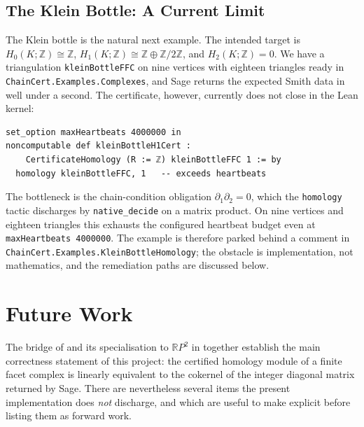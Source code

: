 \documentclass[11pt]{article}
\theoremstyle{plain}
\theoremstyle{definition}
\theoremstyle{remark}
\newcommand{\lean}[1]{\lstinline[language=lean]|#1|}
\begin{document}
\subsection{The Klein Bottle: A Current Limit}\label{sec:klein-attempt}

The Klein bottle is the natural next example. The intended target is
\(H_0(K;\mathbb{Z}) \cong \mathbb{Z}\),
\(H_1(K;\mathbb{Z}) \cong \mathbb{Z} \oplus \mathbb{Z}/2\mathbb{Z}\), and
\(H_2(K;\mathbb{Z}) = 0\). We have a triangulation
\lean{kleinBottleFFC} on nine vertices with eighteen triangles ready in
\texttt{ChainCert.Examples.Complexes}, and Sage returns the expected
Smith data in well under a second. The certificate, however, currently
does not close in the Lean kernel:
\begin{lstlisting}[caption={Klein bottle: cert still has a heartbeat-bound \texttt{sorry}.},label={lst:klein-attempt}]
set_option maxHeartbeats 4000000 in
noncomputable def kleinBottleH1Cert :
    CertificateHomology (R := ℤ) kleinBottleFFC 1 := by
  homology kleinBottleFFC, 1   -- exceeds heartbeats
\end{lstlisting}
The bottleneck is the chain-condition obligation
\(\partial_1 \partial_2 = 0\), which the \lean{homology} tactic discharges
by \texttt{native\_decide} on a matrix product. On nine vertices and
eighteen triangles this exhausts the configured heartbeat budget even at
\texttt{maxHeartbeats 4000000}. The example is therefore parked behind a
comment in \texttt{ChainCert.Examples.KleinBottleHomology}; the obstacle
is implementation, not mathematics, and the remediation paths are
discussed below.

\section{Future Work}\label{sec:future-work}

The bridge of  and its specialisation to \(\mathbb{R}P^2\)
in  together establish the main correctness statement
of this project: the certified homology module of a finite facet complex
is linearly equivalent to the cokernel of the integer diagonal matrix
returned by Sage. There are nevertheless several items the present
implementation does \emph{not} discharge, and which are useful to make
explicit before listing them as forward work.
\end{document}
